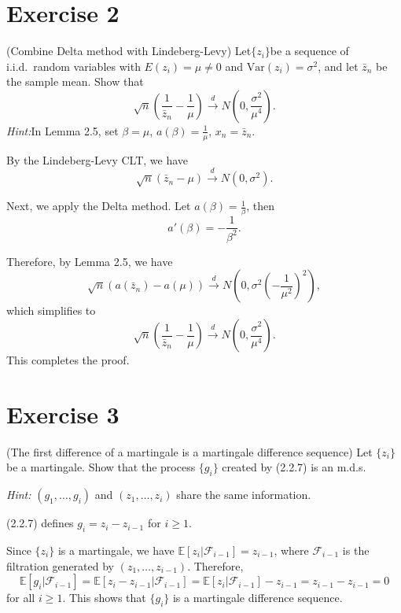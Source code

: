 \documentclass[12pt, letterpaper, onecolumn]{exam}
\begin{document}
\section*{Exercise 2}
 (Combine Delta method with Lindeberg-Levy) Let$\{z_{i}\}$be a sequence of i.i.d.\ random
variables with $E(z_{i})=\mu \neq 0$ and $\mathrm{Var}(z_{i})=\sigma^{2}$,
and let $\bar{z}_{n}$ be the sample mean. Show that
\[
    \sqrt{n}\left(\frac{1}{\bar{z}_{n}}-\frac{1}{\mu}\right)\xrightarrow{d}N\!
    \left(0,\frac{\sigma^{2}}{\mu^{4}}\right).
\]
\textit{Hint:}In Lemma 2.5, set $\beta=\mu$, $a(\beta)=\frac{1}{\mu}$,
$x_{n}=\bar{z}_{n}$.
\begin{solution}
    By the Lindeberg-Levy CLT, we have
    \[
        \sqrt{n}(\bar{z}_{n}-\mu)\xrightarrow{d}N(0,\sigma^{2}).
    \]

    Next, we apply the Delta method. Let $a(\beta)=\frac{1}{\beta}$, then
    \[
        a'(\beta)=-\frac{1}{\beta^{2}}.
    \]

    Therefore, by Lemma 2.5, we have
    \[
        \sqrt{n}\left(a(\bar{z}_{n})-a(\mu)\right)\xrightarrow{d}N\! \left(0,
        \sigma^{2}\left(-\frac{1}{\mu^{2}}\right)^{2}\right),
    \]
    which simplifies to
    \[
        \sqrt{n}\left(\frac{1}{\bar{z}_{n}}-\frac{1}{\mu}\right)\xrightarrow{d}
        N\! \left(0,\frac{\sigma^{2}}{\mu^{4}}\right).
    \]
    This completes the proof.
\end{solution}

\section*{Exercise 3}
 (The first difference of a martingale is a martingale difference sequence)
Let $\{z_{i}\}$ be a martingale. Show that the process $\{g_{i}\}$ created by
(2.2.7) is an m.d.s.

\textit{Hint:} $(g_{1},\ldots,g_{i})$ and $(z_{1},\ldots,z_{i})$ share the same
information.
\begin{solution}
    (2.2.7) defines $g_{i}=z_{i}-z_{i-1}$ for $i\geq 1$.

    Since $\{z_{i}\}$ is a martingale, we have $\mathbb{E}[z_{i}|\mathcal{F}_{i-1}
        ]=z_{i-1}$, where $\mathcal{F}_{i-1}$ is the filtration generated by
    $(z_{1},\ldots,z_{i-1})$. Therefore,
    \[
        \mathbb{E}[g_{i}| \mathcal{F}_{i-1}]=\mathbb{E}[z_{i}-z_{i-1}|\mathcal{F}
        _{i-1}]=\mathbb{E}[z_{i}|\mathcal{F}_{i-1}]-z_{i-1}=z_{i-1}-z_{i-1}=0
    \]
    for all $i\geq 1$. This shows that $\{g_{i}\}$ is a martingale difference
    sequence.
\end{solution}
\end{document}

